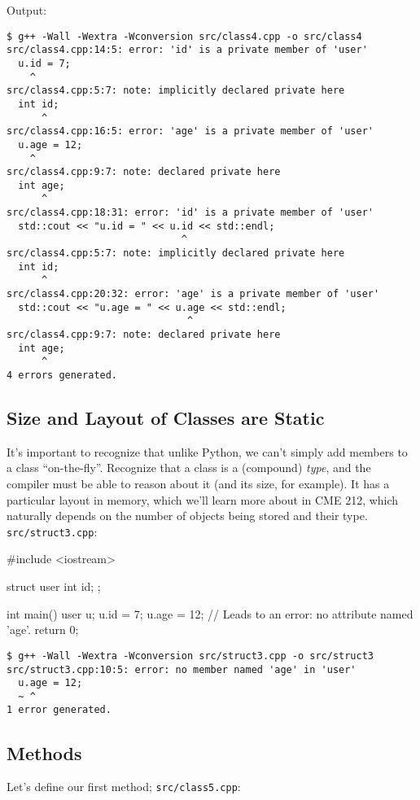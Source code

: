 \documentclass[12pt,letterpaper,twoside]{article}
\begin{document}
Output:

\begin{verbatim}
$ g++ -Wall -Wextra -Wconversion src/class4.cpp -o src/class4
src/class4.cpp:14:5: error: 'id' is a private member of 'user'
  u.id = 7;
    ^
src/class4.cpp:5:7: note: implicitly declared private here
  int id;
      ^
src/class4.cpp:16:5: error: 'age' is a private member of 'user'
  u.age = 12;
    ^
src/class4.cpp:9:7: note: declared private here
  int age;
      ^
src/class4.cpp:18:31: error: 'id' is a private member of 'user'
  std::cout << "u.id = " << u.id << std::endl;
                              ^
src/class4.cpp:5:7: note: implicitly declared private here
  int id;
      ^
src/class4.cpp:20:32: error: 'age' is a private member of 'user'
  std::cout << "u.age = " << u.age << std::endl;
                               ^
src/class4.cpp:9:7: note: declared private here
  int age;
      ^
4 errors generated.
\end{verbatim}

\subsection{Size and Layout of Classes are Static}
It's important to recognize that unlike Python, we can't simply add members to
a class ``on-the-fly''. Recognize that a class is a (compound) \emph{type}, and
the compiler must be able to reason about it (and its size, for example). 
It has a particular layout in memory, which we'll learn more about in 
CME 212, which naturally depends on the number of objects being stored and 
their type.
\texttt{src/struct3.cpp}:

\begin{cpp}
#include <iostream>

struct user { int id; };

int main() {
  user u;
  u.id = 7;
  u.age = 12;   // Leads to an error: no attribute named 'age'.
  return 0;
}
\end{cpp}

\begin{verbatim}
$ g++ -Wall -Wextra -Wconversion src/struct3.cpp -o src/struct3
src/struct3.cpp:10:5: error: no member named 'age' in 'user'
  u.age = 12;
  ~ ^
1 error generated.
\end{verbatim}

\subsection{Methods}
Let's define our first method; \texttt{src/class5.cpp}:
\end{document}
